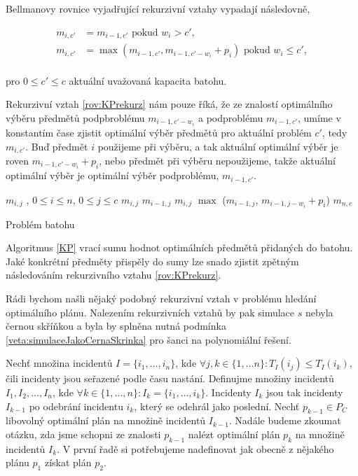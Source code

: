 Bellmanovy rovnice vyjadřující rekurzivní vztahy vypadají následovně,

\begin{definice}\label{rov:KPrekurz}
  \begin{align*}
    m_{i, c'} &= m_{i - 1, c'} \text{ pokud } w_i > c', \\
    m_{i, c'} &= \max (m_{i - 1, c'}, m_{i - 1, c' - w_i} + p_i) \text{ pokud } w_i \leq c',
  \end{align*}
  \\
  pro $0 \leq c' \leq c$ aktuální uvažovaná kapacita batohu.
\end{definice}

Rekurzivní vztah \ref{rov:KPrekurz} nám pouze říká, že ze znalostí optimálního výběru předmětů podpbroblému $m_{i-1, c' - w_i}$ a podproblému $m_{i - 1, c'}$,
umíme v konstantím čase zjistit optimální výběr předmětů pro aktuální problém $c'$, tedy $m_{i, c'}$.
Buď předmět $i$ použijeme při výběru, a tak aktuální optimální výběr je roven $m_{i - 1, c' - w_i} + p_i$,
nebo předmět při výběru nepoužijeme, takže aktuální optimální výběr je optimální výběr podproblému, $m_{i - 1, c'}$. 

\begin{algorithm}[h]
  \begin{algorithmic}[1]
    \State $m_{i, j}$ , $0 \leq i \leq n$, $0 \leq j \leq c$
          \State $m_{i, j}$ \gets $m_{i - 1, j}$
        \Else
          \State $m_{i, j}$ \gets $\max$ ($m_{i - 1, j}$, $m_{i - 1, j - w_i} + p_i$)
        \EndIf
      \EndFor
    \EndFor
    \State \Return $m_{n,c}$
  \EndFunction
  \end{algorithmic}
  \caption{Problém batohu}
  \label{KP}
\end{algorithm}

Algoritmus \ref{KP} vrací sumu hodnot optimálních předmětů přidaných do batohu.
Jaké konkrétní předměty přispěly do sumy lze snado zjistit zpětným následováním rekurzivního vztahu \ref{rov:KPrekurz}.

Rádi bychom našli nějaký podobný rekurzivní vztah v problému hledání optimálního plánu.
Nalezením rekurzivních vztahů by pak simulace $s$ nebyla černou skříňkou a byla by splněna nutná podmínka \ref{veta:simulaceJakoCernaSkrinka} pro šanci na polynomiální řešení.

Nechť množina incidentů $I = \{ i_1, \dots , i_n \}$, kde $\forall j, k \in \{ 1, \dots n\} \colon T_I(i_j) \leq T_I(i_k)$, čili incidenty jsou seřazené podle času nastání.
Definujme množiny incidentů $I_1, I_2, \dots , I_n$, kde $\forall k \in \{ 1, \dots, n \} \colon I_k = \{ i_1, \dots, i_k \}$.
Incidenty $I_k$ jsou tak incidenty $I_{k-1}$ po odebrání incidentu $i_k$, který se odehrál jako poslední.
Nechť $p_{k-1} \in P_C$ libovolný optimální plán na množině incidentů $I_{k-1}$.
Nadále budeme zkoumat otázku, zda jsme schopni ze znalosti $p_{k-1}$ nalézt optimální plán $p_k$ na množině incidentů $I_k$.
V první řadě si potřebujeme nadefinovat jak obecně z nějakého plánu $p_1$ získat plán $p_2$. 

